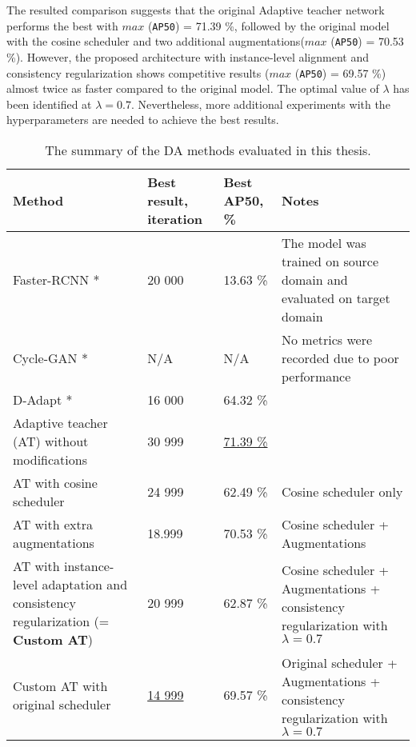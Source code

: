 The resulted comparison suggests that the original Adaptive teacher network performs the best with $max$ (\texttt{AP50}) = 71.39 \%, followed by the original model with the cosine scheduler and two additional augmentations($max$ (\texttt{AP50}) = 70.53 \%).  However, the proposed architecture with instance-level alignment and consistency regularization shows competitive results ($max$ (\texttt{AP50}) = 69.57 \%) almost twice as faster compared to the original model. The optimal value of $\lambda$ has been identified at  $\lambda = 0.7$. Nevertheless, more additional experiments with the hyperparameters are needed to achieve the best results. 

\begin{table}
\centering
\caption{The summary of the DA methods evaluated in this thesis.}\label{summary_table_1} 
\begin{tabularx}{0.95\textwidth}{|X|X|X|X|} 
        \hline
        \textbf{Method} & \textbf{Best result, iteration} & \textbf{Best AP50, \%} & \textbf{Notes} \\
        \hline
        Faster-RCNN \cite{ima} * & 20 000 & 13.63 \% & \multicolumn{1}{m{3cm}|}{The model was trained on source domain and evaluated on target domain} \\ 
        \hline
        Cycle-GAN \cite{Zhu2017} * & N/A & N/A & \multicolumn{1}{m{3cm}|}{No metrics were recorded due to poor performance}\\ 
        \hline
        D-Adapt \cite{Jiang2021} * & 16 000 & 64.32 \% & \multicolumn{1}{m{3cm}|}{} \\ 
        \hline
        Adaptive teacher (AT) \cite{Li2021} without modifications & 30 999 & \uline{71.39 \%} & \multicolumn{1}{m{3cm}|}{} \\ 
        \hline
        AT with cosine scheduler & 24 999 & 62.49 \% & \multicolumn{1}{m{3cm}|}{Cosine scheduler only} \\ 
        \hline
        AT with extra augmentations & 18.999 & 70.53 \% & \multicolumn{1}{m{3cm}|}{Cosine scheduler + Augmentations} \\ 
        \hline
        AT with instance-level adaptation and consistency regularization (= \textbf{Custom AT}) & 20 999 & 62.87 \% & \multicolumn{1}{m{3cm}|}{Cosine scheduler + Augmentations + consistency regularization with $\lambda = 0.7$}  \\ 
        \hline
        Custom AT with original scheduler & \uline{14 999} & 69.57 \% & \multicolumn{1}{m{3cm}|}{Original scheduler + Augmentations + consistency regularization with $\lambda = 0.7$ } \\ 

\end{tabularx}
\end{table}
